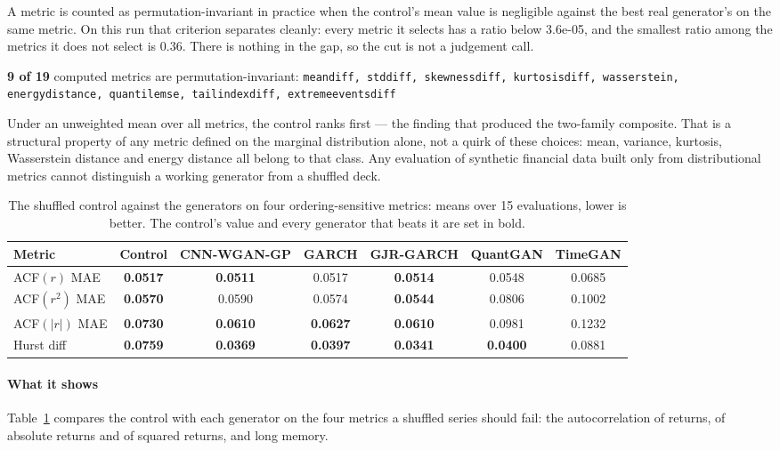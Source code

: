 \documentclass[11pt,a4paper]{article}
\makeatletter
\DeclareRobustCommand{\_}{\ifmmode\nfss@text{\textunderscore}\else\textunderscore\allowbreak\fi}
\makeatother
\begin{document}
A metric is counted as permutation-invariant in practice when the control's mean value is negligible against the best real generator's on the same metric. On this run that criterion separates cleanly: every metric it selects has a ratio below 3.6e-05, and the smallest ratio among the metrics it does not select is 0.36. There is nothing in the gap, so the cut is not a judgement call.

\textbf{9 of 19} computed metrics are permutation-invariant:
{\footnotesize\texttt{mean\_diff, std\_diff, skewness\_diff, kurtosis\_diff, wasserstein, energy\_distance, quantile\_mse, tail\_index\_diff, extreme\_events\_diff}}

Under an unweighted mean over all metrics, the control ranks first --- the finding that produced the two-family composite. That is a structural property of any metric defined on the marginal distribution alone, not a quirk of these choices: mean, variance, kurtosis, Wasserstein distance and energy distance all belong to that class. Any evaluation of synthetic financial data built only from distributional metrics cannot distinguish a working generator from a shuffled deck.

\begin{table}[htbp]
\centering
\caption{The shuffled control against the generators on four ordering-sensitive metrics: means over 15 evaluations, lower is better. The control's value and every generator that beats it are set in bold.}
\label{tab:control}
\begin{tabular}{@{}lcccccc@{}}
\toprule
Metric & Control & CNN-WGAN-GP & GARCH & GJR-GARCH & QuantGAN & TimeGAN \\
\midrule
ACF$(r)$ MAE & \textbf{0.0517} & \textbf{0.0511} & 0.0517 & \textbf{0.0514} & 0.0548 & 0.0685 \\
ACF$(r^2)$ MAE & \textbf{0.0570} & 0.0590 & 0.0574 & \textbf{0.0544} & 0.0806 & 0.1002 \\
ACF$(|r|)$ MAE & \textbf{0.0730} & \textbf{0.0610} & \textbf{0.0627} & \textbf{0.0610} & 0.0981 & 0.1232 \\
Hurst diff & \textbf{0.0759} & \textbf{0.0369} & \textbf{0.0397} & \textbf{0.0341} & \textbf{0.0400} & 0.0881 \\
\bottomrule
\end{tabular}
\end{table}

\paragraph{What it shows} Table~\ref{tab:control} compares the control with each generator on the four metrics a shuffled series should fail: the autocorrelation of returns, of absolute returns and of squared returns, and long memory.
\end{document}
